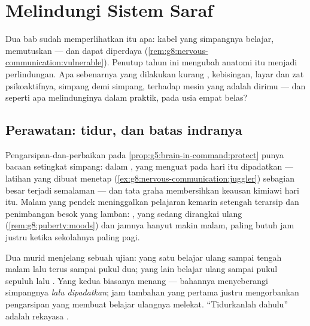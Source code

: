 \chapter{Melindungi Sistem Saraf}\label{ch:g8:protecting-the-nervous-system}

Dua bab sudah memperlihatkan  itu apa: kabel
yang simpangnya belajar, memutuskan --- dan dapat diperdaya
(\cref{rem:g8:nervous-communication:vulnerable}). Penutup
tahun ini mengubah anatomi itu menjadi perlindungan. Apa
sebenarnya yang dilakukan kurang , kebisingan, layar
dan zat psikoaktifnya, simpang demi simpang, terhadap mesin
yang adalah dirimu --- dan seperti apa melindunginya dalam
praktik, pada usia empat belas?

\section{Perawatan: tidur, dan batas indranya}

\begin{proposition}\label{prop:g8:protecting-the-nervous-system:sleep}
Pengarsipan-dan-perbaikan pada
\cref{prop:g5:brain-in-command:protect} punya bacaan
setingkat simpang: dalam ,  yang menguat pada
hari itu dipadatkan --- latihan yang dibuat menetap
(\cref{ex:g8:nervous-communication:juggler}) sebagian besar
terjadi semalaman --- dan tata graha  membersihkan
keausan kimiawi hari itu. Malam yang pendek meninggalkan
pelajaran kemarin setengah terarsip dan penimbangan besok
yang lamban:  , yang sedang dirangkai ulang
(\cref{rem:g8:puberty:moods}) dan jamnya hanyut makin malam,
paling butuh jam  justru ketika sekolahnya paling pagi.
\end{proposition}
\admitted

\begin{example}\label{ex:g8:protecting-the-nervous-system:revision}
Dua murid menjelang sebuah ujian: yang satu belajar ulang
sampai tengah malam lalu terus sampai pukul dua; yang lain
belajar ulang sampai pukul sepuluh lalu . Yang kedua
biasanya menang --- bahannya menyeberangi simpangnya
\emph{lalu dipadatkan}; jam tambahan yang pertama justru
mengorbankan pengarsipan yang membuat belajar ulangnya
melekat. ``Tidurkanlah dahulu'' adalah rekayasa .
\end{example}

